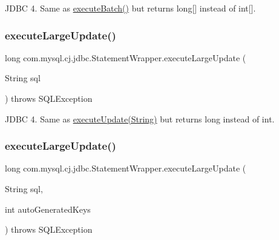 J\+D\+BC 4. Same as \mbox{\hyperlink{classcom_1_1mysql_1_1cj_1_1jdbc_1_1_statement_wrapper_ad79219376f282ae7f12987454e338366}{execute\+Batch()}} but returns long\mbox{[}\mbox{]} instead of int\mbox{[}\mbox{]}. \mbox{\label{classcom_1_1mysql_1_1cj_1_1jdbc_1_1_statement_wrapper_abb4c8e14cb82eeb39515f31705912030}} 
\subsubsection{\texorpdfstring{execute\+Large\+Update()}{executeLargeUpdate()}\hspace{0.1cm}{\footnotesize\ttfamily [1/4]}}
{\footnotesize\ttfamily long com.\+mysql.\+cj.\+jdbc.\+Statement\+Wrapper.\+execute\+Large\+Update (\begin{DoxyParamCaption}\item[{String}]{sql }\end{DoxyParamCaption}) throws S\+Q\+L\+Exception}

J\+D\+BC 4. Same as \mbox{\hyperlink{classcom_1_1mysql_1_1cj_1_1jdbc_1_1_statement_wrapper_ae9f4d1e17c24a7d1310dab07615437d3}{execute\+Update(\+String)}} but returns long instead of int. \mbox{\label{classcom_1_1mysql_1_1cj_1_1jdbc_1_1_statement_wrapper_a65bd051d4128bab4bcbaa58793a64350}} 
\subsubsection{\texorpdfstring{execute\+Large\+Update()}{executeLargeUpdate()}\hspace{0.1cm}{\footnotesize\ttfamily [2/4]}}
{\footnotesize\ttfamily long com.\+mysql.\+cj.\+jdbc.\+Statement\+Wrapper.\+execute\+Large\+Update (\begin{DoxyParamCaption}\item[{String}]{sql,  }\item[{int}]{auto\+Generated\+Keys }\end{DoxyParamCaption}) throws S\+Q\+L\+Exception}

